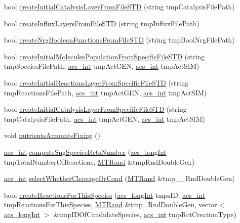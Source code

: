 \begin{DoxyCompactItemize}
\item 
bool \hyperlink{a00014_a29eeb7a1b4689c10fd872e82179b4d84}{create\-Initial\-Catalysis\-Layer\-From\-File\-S\-T\-D} (string tmp\-Catalysis\-File\-Path)
\item 
bool \hyperlink{a00014_a902df40829dad9a885122082ec8fff7a}{create\-Influx\-Layers\-From\-File\-S\-T\-D} (string tmp\-Influx\-File\-Path)
\item 
bool \hyperlink{a00014_abe1a616460ea328067874df715679319}{create\-Nrg\-Boolean\-Functions\-From\-File\-S\-T\-D} (string tmp\-Bool\-Nrg\-File\-Path)
\item 
bool \hyperlink{a00014_aa70e1394bf2240f6e5f14d4cbf369a3b}{create\-Initial\-Molecules\-Population\-From\-Specific\-File\-S\-T\-D} (string tmp\-Species\-File\-Path, \hyperlink{a00050_a8d277355641a098190360234e2ebde35}{acs\-\_\-int} tmp\-Act\-G\-E\-N, \hyperlink{a00050_a8d277355641a098190360234e2ebde35}{acs\-\_\-int} tmp\-Act\-S\-I\-M)
\item 
bool \hyperlink{a00014_a743956229b11d7860dbc89a18f869586}{create\-Initial\-Reactions\-Layer\-From\-Specific\-File\-S\-T\-D} (string tmp\-Reactions\-File\-Path, \hyperlink{a00050_a8d277355641a098190360234e2ebde35}{acs\-\_\-int} tmp\-Act\-G\-E\-N, \hyperlink{a00050_a8d277355641a098190360234e2ebde35}{acs\-\_\-int} tmp\-Act\-S\-I\-M)
\item 
bool \hyperlink{a00014_a6dd31bae82367ebe7d6a6bb062b8cd07}{create\-Initial\-Catalysis\-Layer\-From\-Specific\-File\-S\-T\-D} (string tmp\-Catalysis\-File\-Path, \hyperlink{a00050_a8d277355641a098190360234e2ebde35}{acs\-\_\-int} tmp\-Act\-G\-E\-N, \hyperlink{a00050_a8d277355641a098190360234e2ebde35}{acs\-\_\-int} tmp\-Act\-S\-I\-M)
\item 
void \hyperlink{a00014_a9ceec5e00b0f5a51dd125c583b8ac5ec}{nutrients\-Amounts\-Fixing} ()
\item 
\hyperlink{a00050_a8d277355641a098190360234e2ebde35}{acs\-\_\-int} \hyperlink{a00014_a0fd3cb062d35d2f6dd8961e95dd477b7}{compute\-Sng\-Species\-Rcts\-Number} (\hyperlink{a00050_a19319d75f02db4308bc5c0026d98cd85}{acs\-\_\-long\-Int} tmp\-Total\-Number\-Of\-Reactions, \hyperlink{a00016}{M\-T\-Rand} \&tmp\-Rnd\-Double\-Gen)
\item 
\hyperlink{a00050_a8d277355641a098190360234e2ebde35}{acs\-\_\-int} \hyperlink{a00014_a53282cca8882e86652ab0a22e6966d17}{select\-Whether\-Cleavage\-Or\-Cond} (\hyperlink{a00016}{M\-T\-Rand} \&tmp\-\_\-\-\_\-\-Rnd\-Double\-Gen)
\item 
bool \hyperlink{a00014_a76794f37d6d94b7504c58f0f4a4709ca}{create\-Reactions\-For\-This\-Species} (\hyperlink{a00050_a19319d75f02db4308bc5c0026d98cd85}{acs\-\_\-long\-Int} tmps\-I\-D, \hyperlink{a00050_a8d277355641a098190360234e2ebde35}{acs\-\_\-int} tmp\-Reactions\-For\-This\-Species, \hyperlink{a00016}{M\-T\-Rand} \&tmp\-\_\-\-Rnd\-Double\-Gen, vector$<$ \hyperlink{a00050_a19319d75f02db4308bc5c0026d98cd85}{acs\-\_\-long\-Int} $>$ \&tmp\-I\-D\-Of\-Candidate\-Species, \hyperlink{a00050_a8d277355641a098190360234e2ebde35}{acs\-\_\-int} tmp\-Rct\-Creation\-Type)

\end{DoxyCompactItemize}
